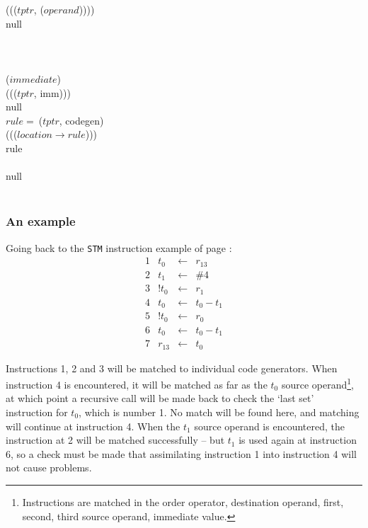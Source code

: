 \begin{tabbing}
      \startblk
         ((($tptr$, ($operand$))))\\
        \startblk
           null\\
        \stopblk
      \stopblk
      \\
    \stopblk
    \\
  \stopblk
  \\
   ($immediate$)\\
  \startblk
     ((($tptr$, imm)))\\
    \startblk
       null\\
    \stopblk
  \stopblk
  $rule =\ $($tptr$, codegen)\\
   ((($location \rightarrow rule$)))\\
  \startblk
     rule\\
  \stopblk
  \\
  \startblk
     null\\
  \stopblk
  \\
\stopblk
{}
\end{tabbing}

\subsubsection{An example}

Going back to the {\tt STM} instruction example of page \pageref{stmgraph}:
\[
\begin{array}{rrcl}
\mathrm{1} & t_0 & \leftarrow & r_{13}\\
\mathrm{2} & t_1 & \leftarrow & \#4\\
\mathrm{3} & !t_0 & \leftarrow & r_1\\
\mathrm{4} & t_0 & \leftarrow & t_0 - t_1\\
\mathrm{5} & !t_0 & \leftarrow & r_0\\
\mathrm{6} & t_0 & \leftarrow & t_0 - t_1\\
\mathrm{7} & r_{13} & \leftarrow & t_0
\end{array}
\]

Instructions 1, 2 and 3 will be matched to individual code generators. When instruction 4 is encountered, it will be matched as far as the $t_0$ source operand\footnote{Instructions are matched in the order operator, destination operand, first, second, third source operand, immediate value.}, at which point a recursive call will be made back to check the `last set' instruction for $t_0$, which is number 1. No match will be found here, and matching will continue at instruction 4. When the $t_1$ source operand is encountered, the instruction at 2 will be matched successfully -- but $t_1$ is used again at instruction 6, so a check must be made that assimilating instruction 1 into instruction 4 will not cause problems.

